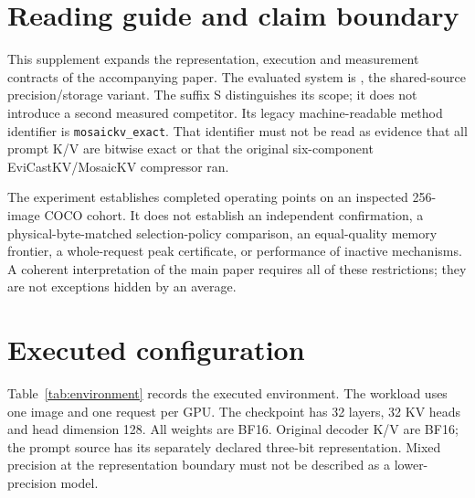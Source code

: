 \documentclass{article}
\begin{document}
\printAffiliationsAndNotice{}
\appendix
\section{Reading guide and claim boundary}
This supplement expands the representation, execution and measurement
contracts of the accompanying paper. The evaluated system is \Evi{}, the
shared-source precision/storage variant. The suffix S distinguishes its
scope; it does not introduce a second measured competitor. Its legacy
machine-readable method identifier is \texttt{mosaickv\_exact}. That identifier
must not be read as evidence that all prompt K/V are bitwise exact or that
the original six-component EviCastKV/MosaicKV compressor ran.

The experiment establishes completed operating points on an inspected
256-image COCO cohort. It does not establish an independent confirmation,
a physical-byte-matched selection-policy comparison, an equal-quality
memory frontier, a whole-request peak certificate, or performance of
inactive mechanisms. A coherent interpretation of the main paper requires
all of these restrictions; they are not exceptions hidden by an average.

\section{Executed configuration}
\begin{table}[t]
\centering\small
\caption{Executed configuration and complete immutable revisions. The source
revision belongs to the measured producer, not the later paper-writing
worktree. Installed serving packages are explicitly not exercised.}
\label{tab:environment}
\end{table}
Table~\ref{tab:environment} records the executed environment. The workload
uses one image and one request per GPU. The checkpoint has 32 layers, 32
KV heads and head dimension 128. All weights are BF16. Original decoder
K/V are BF16; the prompt source has its separately declared three-bit
representation. Mixed precision at the representation boundary must not be
described as a lower-precision model.
\end{document}
